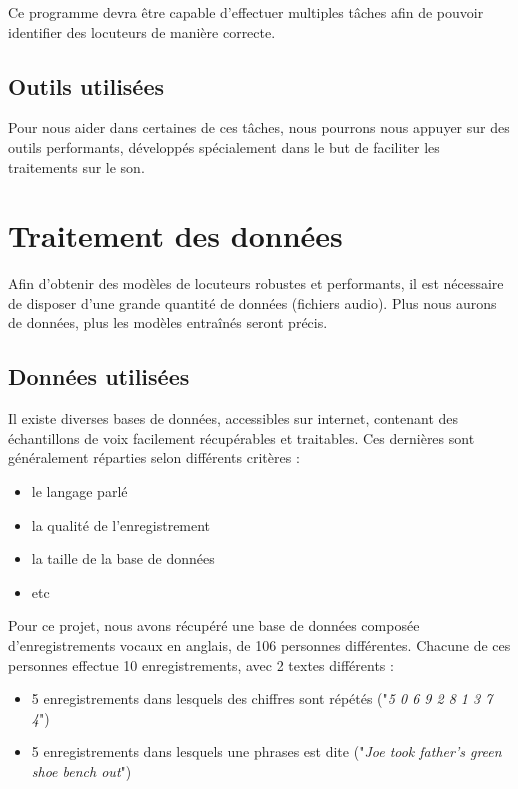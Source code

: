 \documentclass[a4paper, 12pt]{book}
\newcounter{program}[subsection]
\begin{document}
Ce programme devra être capable d'effectuer multiples tâches afin de pouvoir identifier des locuteurs de manière correcte.

\subsection{Outils utilisées}

Pour nous aider dans certaines de ces tâches, nous pourrons nous appuyer sur des outils performants, développés spécialement dans le but de faciliter les traitements sur le son.
\section{Traitement des données}

Afin d'obtenir des modèles de locuteurs robustes et performants, il est nécessaire de disposer d'une grande quantité de données (fichiers audio). Plus nous aurons de données, plus les modèles entraînés seront précis.  

\subsection{Données utilisées\label{data-split}}

Il existe diverses bases de données, accessibles sur internet, contenant des échantillons de voix facilement récupérables et traitables. Ces dernières sont généralement réparties selon différents critères :
\begin{itemize}
  \item le langage parlé
  \item la qualité de l'enregistrement
  \item la taille de la base de données
  \item etc
\end{itemize}

Pour ce projet, nous avons récupéré une base de données composée d'enregistrements vocaux en anglais, de 106 personnes différentes. Chacune de ces personnes effectue 10 enregistrements, avec 2 textes différents :
\begin{itemize}
  \item 5 enregistrements dans lesquels des chiffres sont répétés ("\textit{5 0 6 9 2 8 1 3 7 4}")
  \item 5 enregistrements dans lesquels une phrases est dite ("\textit{Joe took father’s green shoe bench out}")
\end{itemize}
\end{document}
